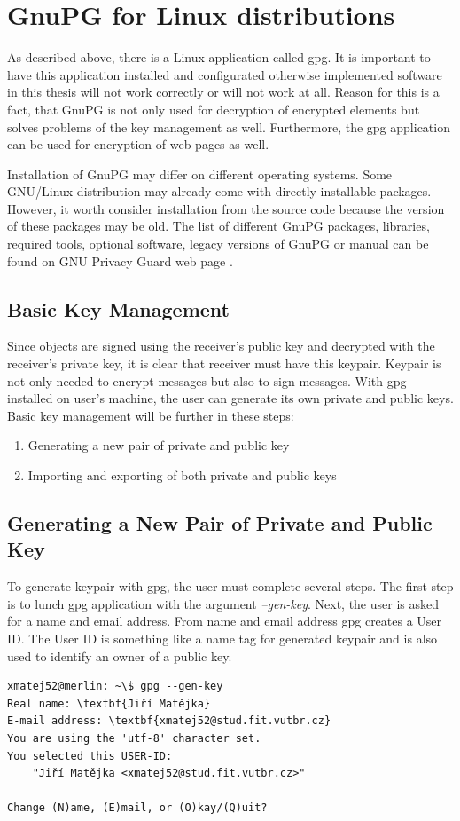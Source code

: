 \section{GnuPG for Linux distributions}
As described above, there is a Linux application called gpg. It is important to have this application installed and configurated otherwise implemented software in this thesis will not work correctly or will not work at all. Reason for this is a fact, that GnuPG is not only used for decryption of encrypted elements but solves problems of the key management as well. Furthermore, the gpg application can be used for encryption of web pages as well.

Installation of GnuPG may differ on different operating systems. Some GNU/Linux distribution may already come with directly installable packages. However, it worth consider installation from the source code because the version of these packages may be old. The list of different GnuPG packages, libraries, required tools, optional software, legacy versions of GnuPG or manual can be found on GNU Privacy Guard web page \cite{GnuPG}.

\subsection{Basic Key Management}
Since objects are signed using the receiver's public key and decrypted with the receiver's private key, it is clear that receiver must have this keypair. Keypair is not only needed to encrypt messages but also to sign messages. With gpg installed on user's machine, the user can generate its own private and public keys. Basic key management will be further in these steps:
\begin{enumerate}
    \item Generating a new pair of private and public key
    \item Importing and exporting of both private and public keys
\end{enumerate}

\subsection*{Generating a New Pair of Private and Public Key}
To generate keypair with gpg, the user must complete several steps. The first step is to lunch gpg application with the argument \textit{--gen-key}. Next, the user is asked for a name and email address. From name and email address gpg creates a User ID. The User ID is something like a name tag for generated keypair and is also used to identify an owner of a public key.
\begin{Verbatim}[commandchars=\\\{\},codes={\catcode`$=3\catcode`_=8},samepage=true,frame=single]
xmatej52@merlin: ~\$ gpg --gen-key 
Real name: \textbf{Jiří Matějka}
E-mail address: \textbf{xmatej52@stud.fit.vutbr.cz}
You are using the 'utf-8' character set.
You selected this USER-ID:
    "Jiří Matějka <xmatej52@stud.fit.vutbr.cz>"

Change (N)ame, (E)mail, or (O)kay/(Q)uit?
\end{Verbatim}

